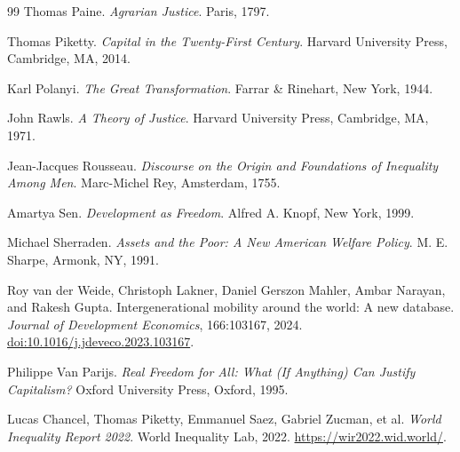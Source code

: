 \documentclass[11pt]{article}
\begin{document}
\begin{thebibliography}{99}
Thomas Paine.
\newblock \emph{Agrarian Justice}.
\newblock Paris, 1797.

Thomas Piketty.
\newblock \emph{Capital in the Twenty-First Century}.
\newblock Harvard University Press, Cambridge, MA, 2014.

Karl Polanyi.
\newblock \emph{The Great Transformation}.
\newblock Farrar \& Rinehart, New York, 1944.

John Rawls.
\newblock \emph{A Theory of Justice}.
\newblock Harvard University Press, Cambridge, MA, 1971.

Jean-Jacques Rousseau.
\newblock \emph{Discourse on the Origin and Foundations of Inequality Among Men}.
\newblock Marc-Michel Rey, Amsterdam, 1755.

Amartya Sen.
\newblock \emph{Development as Freedom}.
\newblock Alfred A. Knopf, New York, 1999.

Michael Sherraden.
\newblock \emph{Assets and the Poor: A New American Welfare Policy}.
\newblock M. E. Sharpe, Armonk, NY, 1991.

Roy van der Weide, Christoph Lakner, Daniel Gerszon Mahler, Ambar Narayan, and
Rakesh Gupta.
\newblock Intergenerational mobility around the world: A new database.
\newblock \emph{Journal of Development Economics}, 166:103167, 2024.
\newblock \href{https://doi.org/10.1016/j.jdeveco.2023.103167}{doi:10.1016/j.jdeveco.2023.103167}.

Philippe Van Parijs.
\newblock \emph{Real Freedom for All: What (If Anything) Can Justify Capitalism?}
\newblock Oxford University Press, Oxford, 1995.

Lucas Chancel, Thomas Piketty, Emmanuel Saez, Gabriel Zucman, et al.
\newblock \emph{World Inequality Report 2022}.
\newblock World Inequality Lab, 2022.
\newblock \url{https://wir2022.wid.world/}.

\end{thebibliography}
\end{document}
